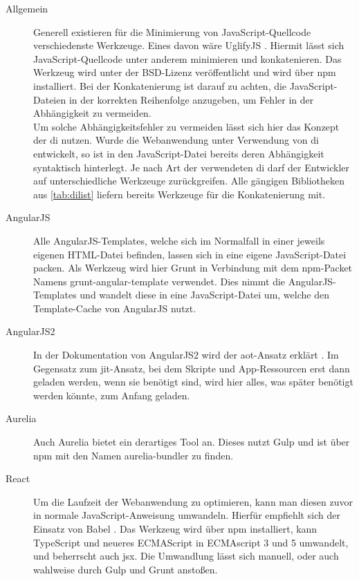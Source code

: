 \begin{description}
	\item[Allgemein] Generell existieren für die Minimierung von JavaScript-Quellcode verschiedenste Werkzeuge. Eines davon wäre UglifyJS \cite{Bazon2016}. Hiermit lässt sich JavaScript-Quellcode unter anderem minimieren und konkatenieren. Das Werkzeug wird unter der BSD-Lizenz veröffentlicht und wird über \ac{npm} installiert. Bei der Konkatenierung ist darauf zu achten, die JavaScript-Dateien in der korrekten Reihenfolge anzugeben, um Fehler in der Abhängigkeit zu vermeiden. \\
	Um solche Abhängigkeitsfehler zu vermeiden lässt sich hier das Konzept der \ac{di} nutzen. Wurde die Webanwendung unter Verwendung von \ac{di} entwickelt, so ist in den JavaScript-Datei bereits deren Abhängigkeit syntaktisch hinterlegt. Je nach Art der verwendeten \ac{di} darf der Entwickler auf unterschiedliche Werkzeuge zurückgreifen. Alle gängigen Bibliotheken aus \autoref{tab:dilist} liefern bereits Werkzeuge für die Konkatenierung mit.

	\item[AngularJS] Alle AngularJS-Templates, welche sich im Normalfall in einer jeweils eigenen HTML-Datei befinden, lassen sich in eine eigene JavaScript-Datei packen. Als Werkzeug wird hier Grunt in Verbindung mit dem \ac{npm}-Packet Namens grunt-angular-template \cite{Clemmons2016} verwendet. Dies nimmt die AngularJS-Templates und wandelt diese in eine JavaScript-Datei um, welche den Template-Cache \cite{Google2016c} von AngularJS nutzt.
	
	\item[AngularJS2] In der Dokumentation von AngularJS2 wird der \ac{aot}-Ansatz erklärt \cite{Google2016a}. Im Gegensatz zum \ac{jit}-Ansatz, bei dem Skripte und App-Ressourcen erst dann geladen werden, wenn sie benötigt sind, wird hier alles, was später benötigt werden könnte, zum Anfang geladen.
	
	\item[Aurelia] Auch Aurelia bietet ein derartiges Tool an. Dieses nutzt Gulp und ist über \ac{npm} mit den Namen aurelia-bundler \cite{Aurelia2016} zu finden.
	
	\item[React] Um die Laufzeit der Webanwendung zu optimieren, kann man diesen zuvor in normale JavaScript-Anweisung umwandeln. Hierfür empfiehlt sich der Einsatz von Babel \cite{Babel2016}. Das Werkzeug wird über \ac{npm} installiert, kann TypeScript und neueres ECMAScript in ECMAscript 3 und 5 umwandelt, und beherrscht auch \ac{jsx}. Die Umwandlung lässt sich manuell, oder auch wahlweise durch Gulp und Grunt anstoßen.
	
	
	
\end{description}